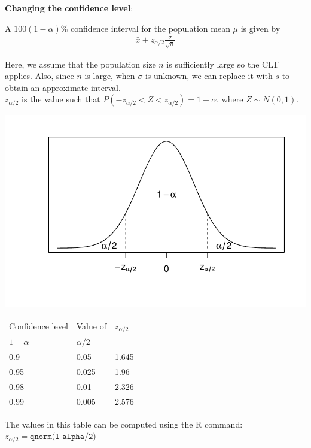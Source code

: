 \documentclass[fleqn, 11pt]{article}\usepackage[]{graphicx}\usepackage[]{color}
\makeatletter
\def\maxwidth{ %
  \ifdim\Gin@nat@width>\linewidth
    \linewidth
  \else
    \Gin@nat@width
  \fi
}
\newenvironment{knitrout}{}{} %
\makeatother
\begin{document}
\clearpage
\textbf{Changing the confidence level}:

A $100(1-\alpha)$\% confidence interval for the population mean $\mu$ is given by
\begin{align*}
\bar{x} \pm z_{\alpha/2} \frac{\sigma}{\sqrt{n}}
\end{align*}

Here, we assume that the population size $n$ is sufficiently large so the CLT applies.  Also, since $n$ is large, when $\sigma$ is unknown, we can replace it with $s$ to obtain an approximate interval.\\

$z_{\alpha / 2}$ is the value such that $P(-z_{\alpha/2} < Z < z_{\alpha/2}) = 1-\alpha$, where $Z \sim N(0,1)$.

\begin{knitrout}
\color{fgcolor}
\includegraphics[width=\maxwidth]{figure/unnamed-chunk-2-1} 
\end{knitrout}

\begin{table}[ht]
\begin{tabular}{|l|l|l|}
\hline
Confidence level & Value of & $z_{\alpha/2}$\\
$1-\alpha$ & $\alpha/2$ & \\
\hline
0.9 & 0.05 & 1.645\\
0.95 & 0.025 & 1.96\\
0.98 & 0.01 & 2.326\\
0.99 & 0.005 & 2.576\\
\hline
\end{tabular}
\end{table}
The values in this table can be computed using the R command:\\
$z_{\alpha/2} = \texttt{qnorm(1-alpha/2)}$\\
\clearpage
\end{document}
